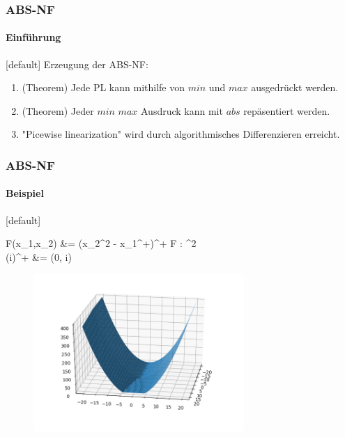 \begin{frame}
	\frametitle{ABS-NF}
	\framesubtitle{Einführung}
	[default]
	Erzeugung der ABS-NF:
	\begin{enumerate}
		\item<1-> (Theorem) Jede PL kann mithilfe von $min$ und $max$ ausgedrückt werden.
		\item<2-> (Theorem) Jeder $min$ $max$ Ausdruck kann mit $abs$ repäsentiert werden.
		\item<3-> "Picewise linearization" wird durch algorithmisches Differenzieren erreicht.
	\end{enumerate}
\end{frame}
\begin{frame}
	\frametitle{ABS-NF}
	\framesubtitle{Beispiel}
	[default]
	\begin{flalign*}
		F(x_1,x_2) &= (x_2^2 - x_1^+)^+ \qquad F : ^2 \rightarrow {} \\
			 (i)^+ &= \max(0, i)
	\end{flalign*}
	\begin{figure}[h]
		\includegraphics[width=8cm]{img/minmax}
	\end{figure}
	
\end{frame}
